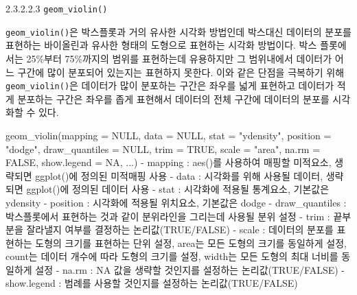 \documentclass[
]{article}
\newenvironment{Shaded}{\begin{snugshade}}{\end{snugshade}}
\newcommand{\AttributeTok}[1]{\textcolor[rgb]{0.77,0.63,0.00}{#1}}
\newcommand{\ConstantTok}[1]{\textcolor[rgb]{0.00,0.00,0.00}{#1}}
\newcommand{\FunctionTok}[1]{\textcolor[rgb]{0.00,0.00,0.00}{#1}}
\newcommand{\NormalTok}[1]{#1}
\newcommand{\SpecialCharTok}[1]{\textcolor[rgb]{0.00,0.00,0.00}{#1}}
\newcommand{\StringTok}[1]{\textcolor[rgb]{0.31,0.60,0.02}{#1}}
\begin{document}
2.3.2.2.3 \texttt{geom\_violin()}

\texttt{geom\_violin()}은 박스플롯과 거의 유사한 시각화 방법인데 박스대신 데이터의 분포를 표현하는 바이올린과 유사한 형태의 도형으로 표현하는 시각화 방법이다. 박스 플롯에서는 25\%부터 75\%까지의 범위를 표현하는데 유용하지만 그 범위내에서 데이터가 어느 구간에 많이 분포되어 있는지는 표현하지 못한다. 이와 같은 단점을 극복하기 위해 \texttt{geom\_violin()}은 데이터가 많이 분포하는 구간은 좌우를 넓게 표현하고 데이터가 적게 분포하는 구간은 좌우를 좁게 표현해서 데이터의 전체 구간에 데이터의 분포를 시각화할 수 있다.

\begin{Shaded}
\begin{Highlighting}[]
\FunctionTok{geom\_violin}\NormalTok{(}\AttributeTok{mapping =} \ConstantTok{NULL}\NormalTok{, }\AttributeTok{data =} \ConstantTok{NULL}\NormalTok{, }\AttributeTok{stat =} \StringTok{"ydensity"}\NormalTok{, }\AttributeTok{position =} \StringTok{"dodge"}\NormalTok{, }\AttributeTok{draw\_quantiles =} \ConstantTok{NULL}\NormalTok{, }\AttributeTok{trim =} \ConstantTok{TRUE}\NormalTok{, }\AttributeTok{scale =} \StringTok{"area"}\NormalTok{, }\AttributeTok{na.rm =} \ConstantTok{FALSE}\NormalTok{, }\AttributeTok{show.legend =} \ConstantTok{NA}\NormalTok{, ...)}
  \SpecialCharTok{{-}}\NormalTok{ mapping }\SpecialCharTok{:} \FunctionTok{aes}\NormalTok{()를 사용하여 매핑할 미적요소, 생략되면 }\FunctionTok{ggplot}\NormalTok{()에 정의된 미적매핑 사용}
  \SpecialCharTok{{-}}\NormalTok{ data }\SpecialCharTok{:}\NormalTok{ 시각화를 위해 사용될 데이터, 생략되면 }\FunctionTok{ggplot}\NormalTok{()에 정의된 데이터 사용}
  \SpecialCharTok{{-}}\NormalTok{ stat }\SpecialCharTok{:}\NormalTok{ 시각화에 적용될 통계요소, 기본값은 }\StringTok{\textquotesingle{}ydensity\textquotesingle{}}
  \SpecialCharTok{{-}}\NormalTok{ position }\SpecialCharTok{:}\NormalTok{ 시각화에 적용될 위치요소, 기본값은 }\StringTok{\textquotesingle{}dodge\textquotesingle{}}
  \SpecialCharTok{{-}}\NormalTok{ draw\_quantiles }\SpecialCharTok{:}\NormalTok{ 박스플롯에서 표현하는 것과 같이 분위라인을 그리는데 사용될 분위 설정}
  \SpecialCharTok{{-}}\NormalTok{ trim }\SpecialCharTok{:}\NormalTok{ 끝부분을 잘라낼지 여부를 결정하는 논리값(}\ConstantTok{TRUE}\SpecialCharTok{/}\ConstantTok{FALSE}\NormalTok{)}
  \SpecialCharTok{{-}}\NormalTok{ scale }\SpecialCharTok{:}\NormalTok{ 데이터의 분포를 표현하는 도형의 크기를 표현하는 단위 설정, }\StringTok{\textquotesingle{}area\textquotesingle{}}\NormalTok{는 모든 도형의 크기를 동일하게 설정, }\StringTok{\textquotesingle{}count\textquotesingle{}}\NormalTok{는 데이터 개수에 따라 도형의 크기를 설정, }\StringTok{\textquotesingle{}width\textquotesingle{}}\NormalTok{는 모든 도형의 최대 너비를 동일하게 설정}
  \SpecialCharTok{{-}}\NormalTok{ na.rm }\SpecialCharTok{:} \ConstantTok{NA}\NormalTok{ 값을 생략할 것인지를 설정하는 논리값(}\ConstantTok{TRUE}\SpecialCharTok{/}\ConstantTok{FALSE}\NormalTok{)}
  \SpecialCharTok{{-}}\NormalTok{ show.legend }\SpecialCharTok{:}\NormalTok{ 범례를 사용할 것인지를 설정하는 논리값(}\ConstantTok{TRUE}\SpecialCharTok{/}\ConstantTok{FALSE}\NormalTok{) }
\end{Highlighting}
\end{Shaded}
\end{document}
